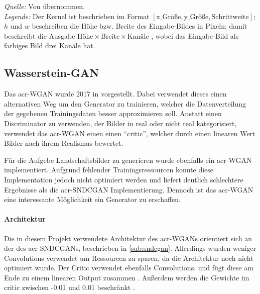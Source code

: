 \begin{table}[]
\begin{center}
\begin{minipage}{.5\linewidth}
\begin{tabular}{lcl}
            \bottomrule
        \end{tabular}
    \end{minipage} 
  \end{center}
  \begin{center}
    \bigskip
    \emph{Quelle:} Von \cite[S. 12]{kurach2018gan} übernommen.\\
    \emph{Legende:} Der Kernel ist beschrieben im Format $[\text{x\_Größe},
    \text{y\_Größe}, \text{Schrittweite}]$; $h$ und $w$ beschreiben die Höhe
    bzw. Breite des Eingabe-Bildes in Pixeln; damit beschreibt die Ausgabe
    $\text{Höhe} \times \text{Breite} \times \text{Kanäle}$ , wobei das
    Eingabe-Bild als farbiges Bild drei Kanäle hat.
  \end{center}
\end{table}
 
 \subsection{Wasserstein-GAN} %
 Das \gls{acr-WGAN} wurde 2017 in 
 \cite{arjovsky_wasserstein_2017} vorgestellt. Dabei verwendet dieses einen
 alternativen Weg um den Generator zu trainieren, welcher die Datenverteilung
 der gegebenen Trainingsdaten besser approximieren soll. Anstatt einen
 Discriminator zu verwenden, der Bilder in real oder nicht real kategorisiert,
 verwendet das \gls{acr-WGAN} einen einen \enquote{critic}, welcher durch einen
 linearen Wert Bilder nach ihrem Realismus bewertet. 
 
 Für die Aufgebe Landschaftsbilder zu generieren wurde ebenfalls ein
 \gls{acr-WGAN} implementiert. Aufgrund fehlender Trainingsressourcen konnte
 diese Implementation jedoch nicht optimiert werden und liefert deutlich
 schlechtere Ergebnisse als die \gls{acr-SNDCGAN} Implementierung. Dennoch ist
 das \gls{acr-WGAN} eine interessante Möglichkeit ein Generator zu erschaffen.  
 
 \paragraph{Architektur} Die in diesem Projekt verwendete Architektur des
 \gls{acr-WGAN}s orientiert sich an der des \gls{acr-SNDCGAN}s, beschrieben in
 \cref{sub:sndcgan}. Allerdings wurden weniger Convolutions verwendet um
 Ressourcen zu sparen, da die Architektur noch nicht optimiert wurde. Der Critic
 verwendet ebenfalls Convolutions, und fügt diese am Ende zu einem linearen Output zusammen \cite{brownlee_how_2019-1}.
 Außerdem werden die Gewichte im critic zwischen -0.01 und 0.01 beschränkt
 \cite{arjovsky_wasserstein_2017}. 
 
